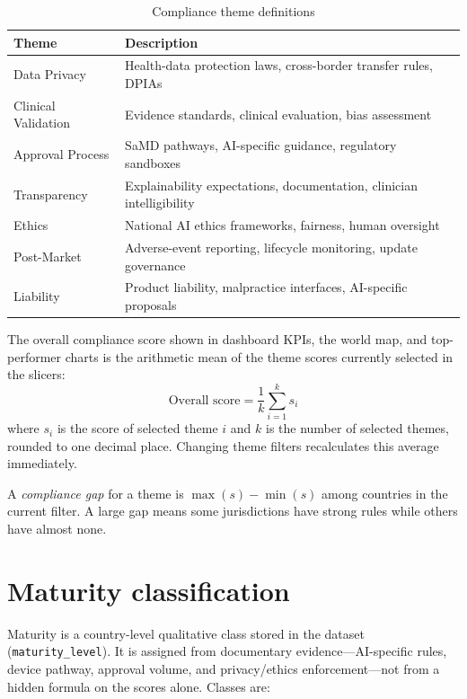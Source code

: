 \documentclass[12pt,a4paper]{report}
\begin{document}
\begin{table}[!htbp]
  \centering
  \caption{Compliance theme definitions}
  \label{tab:themes}
  \begin{tabularx}{\textwidth}{@{}l X@{}}
    \toprule
    \textbf{Theme} & \textbf{Description} \\
    \midrule
    Data Privacy & Health-data protection laws, cross-border transfer rules, DPIAs \\
    Clinical Validation & Evidence standards, clinical evaluation, bias assessment \\
    Approval Process & SaMD pathways, AI-specific guidance, regulatory sandboxes \\
    Transparency & Explainability expectations, documentation, clinician intelligibility \\
    Ethics & National AI ethics frameworks, fairness, human oversight \\
    Post-Market & Adverse-event reporting, lifecycle monitoring, update governance \\
    Liability & Product liability, malpractice interfaces, AI-specific proposals \\
    \bottomrule
  \end{tabularx}
\end{table}

The overall compliance score shown in dashboard KPIs, the world map, and top-performer charts is the arithmetic mean of the theme scores currently selected in the slicers:
\begin{equation}
  \text{Overall score} = \frac{1}{k}\sum_{i=1}^{k} s_i
\end{equation}
where $s_i$ is the score of selected theme $i$ and $k$ is the number of selected themes, rounded to one decimal place. Changing theme filters recalculates this average immediately.

A \emph{compliance gap} for a theme is $\max(s)-\min(s)$ among countries in the current filter. A large gap means some jurisdictions have strong rules while others have almost none.

\section{Maturity classification}

Maturity is a country-level qualitative class stored in the dataset (\texttt{maturity\_level}). It is assigned from documentary evidence---AI-specific rules, device pathway, approval volume, and privacy/ethics enforcement---not from a hidden formula on the scores alone. Classes are:
\end{document}
